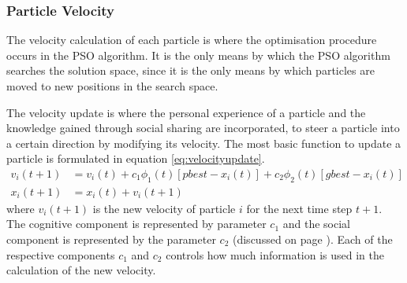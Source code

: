 \subsubsection{Particle Velocity}
\label{sec:particleVelocity}
The velocity calculation of each particle is where the optimisation procedure occurs in the PSO algorithm. It is the only means by which the PSO algorithm searches the solution space, since it is the only means by which particles are moved to new positions in the search space\cite{CompuIntelligenceIntro}.

The velocity update is where the personal experience of a particle and the knowledge gained through social sharing are incorporated, to steer a particle into a certain direction by modifying its velocity. The most basic function to update a particle is formulated in equation \ref{eq:velocityupdate}.
\begin{align}
v_i(t+1) &= v_i(t) + c_1\phi_{1}(t)[pbest - x_i(t)] + c_2\phi_{2}(t)[gbest - x_i(t)]\label{eq:velocityupdate}\\
x_i(t+1) &= x_i(t) + v_i(t+1)\label{eq:positionupdate}
\end{align}
where $v_i(t+1)$ is the new velocity of particle $i$ for the next time step $t+1$. The cognitive component is represented by parameter $c_1$ and the social component is represented by the parameter $c_2$ (discussed on page \pageref{def:cognitivecomponent})\cite{FundamentalSwarm,CompuIntelligenceIntro}. Each of the respective components $c_1$ and $c_2$ controls how much information is used in the calculation of the new velocity. 

